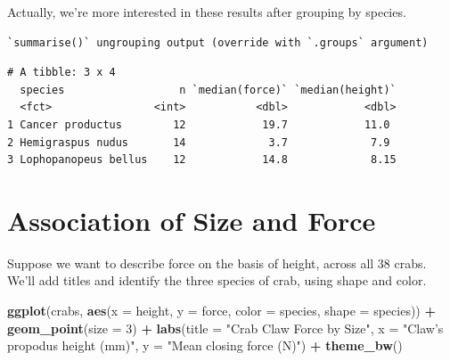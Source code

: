 \documentclass[
]{book}
\newenvironment{Shaded}{\begin{snugshade}}{\end{snugshade}}
\newcommand{\DataTypeTok}[1]{\textcolor[rgb]{0.13,0.29,0.53}{#1}}
\newcommand{\DecValTok}[1]{\textcolor[rgb]{0.00,0.00,0.81}{#1}}
\newcommand{\KeywordTok}[1]{\textcolor[rgb]{0.13,0.29,0.53}{\textbf{#1}}}
\newcommand{\NormalTok}[1]{#1}
\newcommand{\OperatorTok}[1]{\textcolor[rgb]{0.81,0.36,0.00}{\textbf{#1}}}
\newcommand{\StringTok}[1]{\textcolor[rgb]{0.31,0.60,0.02}{#1}}
\begin{document}
Actually, we're more interested in these results after grouping by species.

\begin{Shaded}
\end{Shaded}

\begin{verbatim}
`summarise()` ungrouping output (override with `.groups` argument)
\end{verbatim}

\begin{verbatim}
# A tibble: 3 x 4
  species                  n `median(force)` `median(height)`
  <fct>                <int>           <dbl>            <dbl>
1 Cancer productus        12            19.7            11.0 
2 Hemigraspus nudus       14             3.7             7.9 
3 Lophopanopeus bellus    12            14.8             8.15
\end{verbatim}

\hypertarget{association-of-size-and-force}{%
\section{Association of Size and Force}\label{association-of-size-and-force}}

Suppose we want to describe force on the basis of height, across all 38 crabs. We'll add titles and identify the three species of crab, using shape and color.

\begin{Shaded}
\begin{Highlighting}[]
\KeywordTok{ggplot}\NormalTok{(crabs, }\KeywordTok{aes}\NormalTok{(}\DataTypeTok{x =}\NormalTok{ height, }\DataTypeTok{y =}\NormalTok{ force, }\DataTypeTok{color =}\NormalTok{ species, }\DataTypeTok{shape =}\NormalTok{ species)) }\OperatorTok{+}
\StringTok{    }\KeywordTok{geom_point}\NormalTok{(}\DataTypeTok{size =} \DecValTok{3}\NormalTok{) }\OperatorTok{+}
\StringTok{    }\KeywordTok{labs}\NormalTok{(}\DataTypeTok{title =} \StringTok{"Crab Claw Force by Size"}\NormalTok{, }
         \DataTypeTok{x =} \StringTok{"Claw's propodus height (mm)"}\NormalTok{, }\DataTypeTok{y =} \StringTok{"Mean closing force (N)"}\NormalTok{) }\OperatorTok{+}
\StringTok{    }\KeywordTok{theme_bw}\NormalTok{()}
\end{Highlighting}
\end{Shaded}
\end{document}
